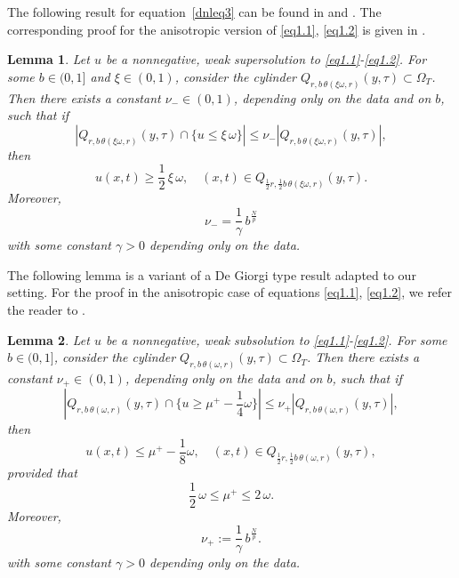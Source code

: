 \documentclass[a4paper,11pt,fullpage]{article}
\numberwithin{equation}{section}
\newtheorem{lemma}{Lemma}[section]
\begin{document}
\noindent The following result for equation~\eqref{dnleq3} can be found in \cite[Lemma~6.1]{BogDuzGiaLiaSch} and \cite[Lemma~3.2]{Hen2022}. The corresponding proof for the anisotropic version of \eqref{eq1.1}, \eqref{eq1.2} is given in \cite[Lemma~2.4]{CiaHenSavSkr2025-1}.

\begin{lemma}\label{lem2.5}
Let $u$ be a nonnegative, weak supersolution to \eqref{eq1.1}-\eqref{eq1.2}. For some $b\in(0,1]$ and $\xi\in(0,1)$, consider the cylinder $Q_{r,b\,\theta(\xi\omega,r)}(y, \tau) \subset \Omega_T$.
Then there exists a constant $\nu_{-}\in(0,1)$, depending only on the data and on $b$, such that if
\begin{equation}\label{eq2.5}
|Q_{r,b\,\theta(\xi\omega,r)}(y, \tau)\cap\{u\leqslant \xi\,\omega\}|\leqslant \nu_- |Q_{r,b\,\theta(\xi\omega,r)}(y, \tau)|,
\end{equation}
then 
\begin{equation}\label{eq2.6}
u(x,t)\geqslant \frac{1}{2}\, \xi\,\omega,\quad (x,t)\in Q_{\frac{1}{2}r,\frac{1}{2}b\,\theta(\xi\omega,r)}(y, \tau).
\end{equation}
Moreover,
\begin{equation*}
\nu_-=\frac{1}{\gamma}\, b^{\frac{N}{p}}
\end{equation*}
with some constant $\gamma>0$ depending only on the data.
\end{lemma}

\noindent The following lemma is a variant of a De Giorgi type result adapted to our setting. For the proof in the anisotropic case of equations \eqref{eq1.1}, \eqref{eq1.2}, we refer the reader to \cite[Lemma~2.5]{CiaHenSavSkr2025-1}.

\begin{lemma}\label{lem2.6}
Let $u$ be a nonnegative, weak subsolution to \eqref{eq1.1}-\eqref{eq1.2}. For some $b\in(0,1]$, consider the cylinder $Q_{r,b\,\theta(\omega,r)}(y, \tau) \subset \Omega_T$.
Then there exists a constant $\nu_{+}\in(0,1)$, depending only on the data and on $b$, such that if
\begin{equation}\label{eq2.12}
|Q_{r,b\,\theta(\omega,r)}(y, \tau)\cap\{u\geqslant \mu^{+}-\frac{1}{4}\omega\}|\leqslant \nu_+ |Q_{r, b\,\theta(\omega,r)}(y, \tau)|,
\end{equation}
then
\begin{equation}\label{eq2.13}
u(x, t)\leqslant \mu^{+}- \frac{1}{8} \omega,\quad (x,t)\in Q_{\frac{1}{2}r,\frac{1}{2}b\,\theta(\omega,r)}(y, \tau),
\end{equation}
provided that
\begin{equation}\label{eq2.14}
\frac{1}{2}\,\omega\leqslant \mu^+\leqslant 2\,\omega.
\end{equation}
Moreover,
\begin{equation*}
\nu_+:=\frac{1}{\gamma}\,b^{\frac{N}{p}}.
\end{equation*}
with some constant $\gamma>0$ depending only on the data.
\end{lemma}
\end{document}
